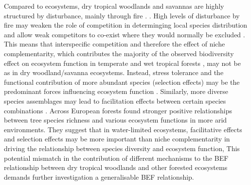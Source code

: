 \documentclass[11pt,a4paper]{article}
\begin{document}
Compared to  ecosystems, dry tropical woodlands and savannas are highly structured by disturbance, mainly through fire  \citep{Sankaran2008, Levick2009}. . High levels of disturbance by fire may weaken the role of competition in determinging local species distribution and allow weak competitors to co-exist where they would normally be excluded \citep{Grime1979, Grace1990}. This means that interspecific competition and therefore the effect of niche complementarity, which contributes the majority of the observed biodiversity effect on ecosystem function in temperate and wet tropical forests \citep{Wright2017, Poorter2015, Sande2017a}, may not be as  in dry woodland/savanna ecosystems. Instead, stress tolerance and the functional contribution of more abundant species (selection effects) may be the predominant forces influencing ecosystem function \citep{Lasky2014, Tobner2016}. Similarly, more diverse species assemblages may lead to facilitation effects between certain species combinations . Across European forests \citet{Ratcliffe2017} found stronger positive relationships between tree species richness and various ecosystem functions in more arid environments. They suggest that in water-limited ecosystems, facilitative effects and selection effects may be more important than niche complementarity in driving the relationship between species diversity and ecosystem function,  This potential mismatch in the contribution of different mechanisms to the BEF relationship between dry tropical woodlands and other forested ecosystems demands further investigation  a generalisable BEF relationship.
\end{document}
